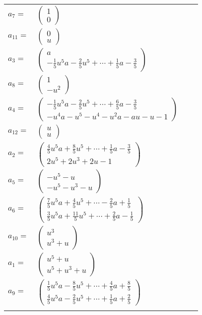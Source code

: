 \documentclass[1p]{elsarticle_modified}
\theoremstyle{definition}
\begin{document}
\begin{tabular}{m{7pt} m{180pt} m{7pt} m{180pt} }
\flushright $a_{7}=$&$\begin{pmatrix}1\\0\end{pmatrix}$ \\
\flushright $a_{11}=$&$\begin{pmatrix}0\\u\end{pmatrix}$ \\
\flushright $a_{3}=$&$\begin{pmatrix}a\\-\frac{1}{5} u^5 a-\frac{2}{5} u^5+\cdots+\frac{1}{5} a-\frac{3}{5}\end{pmatrix}$ \\
\flushright $a_{8}=$&$\begin{pmatrix}1\\- u^2\end{pmatrix}$ \\
\flushright $a_{4}=$&$\begin{pmatrix}-\frac{1}{5} u^5 a-\frac{2}{5} u^5+\cdots+\frac{6}{5} a-\frac{3}{5}\\- u^4 a- u^5- u^4- u^2 a- a u- u-1\end{pmatrix}$ \\
\flushright $a_{12}=$&$\begin{pmatrix}u\\u\end{pmatrix}$ \\
\flushright $a_{2}=$&$\begin{pmatrix}\frac{4}{5} u^5 a+\frac{8}{5} u^5+\cdots+\frac{1}{5} a-\frac{3}{5}\\2 u^5+2 u^3+2 u-1\end{pmatrix}$ \\
\flushright $a_{5}=$&$\begin{pmatrix}- u^5- u\\- u^5- u^3- u\end{pmatrix}$ \\
\flushright $a_{6}=$&$\begin{pmatrix}\frac{7}{5} u^5 a+\frac{4}{5} u^5+\cdots-\frac{2}{5} a+\frac{1}{5}\\\frac{3}{5} u^5 a+\frac{11}{5} u^5+\cdots+\frac{2}{5} a-\frac{1}{5}\end{pmatrix}$ \\
\flushright $a_{10}=$&$\begin{pmatrix}u^3\\u^3+u\end{pmatrix}$ \\
\flushright $a_{1}=$&$\begin{pmatrix}u^5+u\\u^5+u^3+u\end{pmatrix}$ \\
\flushright $a_{9}=$&$\begin{pmatrix}\frac{1}{5} u^5 a-\frac{8}{5} u^5+\cdots+\frac{4}{5} a+\frac{8}{5}\\\frac{4}{5} u^5 a-\frac{2}{5} u^5+\cdots+\frac{1}{5} a+\frac{2}{5}\end{pmatrix}$\\&\end{tabular}
\end{document}
